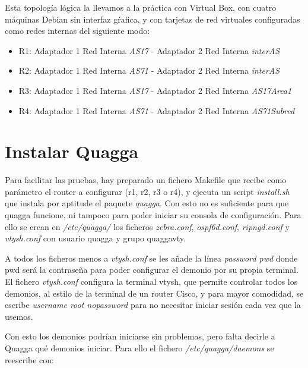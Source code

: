 \documentclass{article}
\begin{document}
\hfill

Esta topología lógica la llevamos a la práctica con Virtual Box, con cuatro máquinas Debian sin interfaz gŕafica, y con tarjetas de red virtuales configuradas como redes internas del siguiente modo:

\begin{itemize}

	\item R1: Adaptador 1 Red Interna \textit{AS17} - Adaptador 2 Red Interna \textit{interAS}

	\item R2: Adaptador 1 Red Interna \textit{AS71} - Adaptador 2 Red Interna \textit{interAS}

	\item R3: Adaptador 1 Red Interna \textit{AS17} - Adaptador 2 Red Interna \textit{AS17Area1}

	\item R4: Adaptador 1 Red Interna \textit{AS71} - Adaptador 2 Red Interna \textit{AS71Subred}

\end{itemize}


\section{Instalar Quagga}

Para facilitar las pruebas, hay preparado un fichero Makefile que recibe como parámetro el router a configurar (r1, r2, r3 o r4), y ejecuta un script \textit{install.sh} que instala por aptitude el paquete \textit{quagga}.
 Con esto no es suficiente para que quagga funcione, ni tampoco para poder iniciar su consola de configuración. Para ello se crean en \textit{/etc/quagga/}
 los ficheros \textit{zebra.conf}, \textit{ospf6d.conf}, \textit{ripngd.conf} y \textit{vtysh.conf} con usuario quagga y grupo quaggavty.

 A todos los ficheros menos a \textit{vtysh.conf} se les añade la línea \textit{password pwd} donde pwd será la contraseña para poder configurar el demonio por su propia terminal. El fichero \textit{vtysh.conf} configura la terminal vtysh, que permite controlar todos los demonios, al estilo de la terminal de un router Cisco, y para mayor comodidad, se escribe \textit{username root nopassword} para no necesitar iniciar sesión cada vez que la usemos.

 Con esto los demonios podrían iniciarse sin problemas, pero falta decirle a Quagga qué demonios iniciar. Para ello el fichero \textit{/etc/quagga/daemons} se reescribe con:
\end{document}
